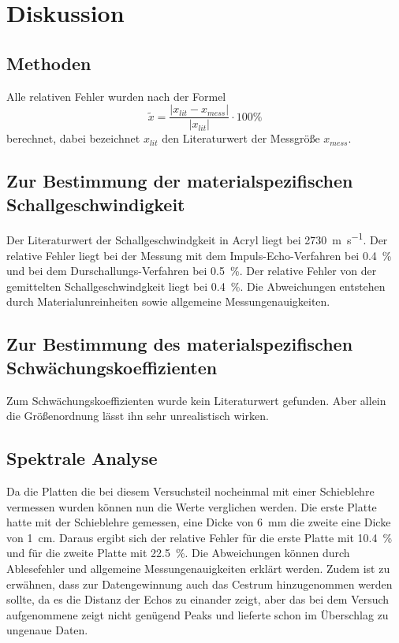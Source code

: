 \section{Diskussion}
\label{sec:Diskussion}
\subsection{Methoden}
Alle relativen Fehler wurden nach der Formel
\begin{equation*}
  \tilde{x} = \frac{ \lvert x_{lit} - x_{mess} \rvert}{\lvert x_{lit} \rvert}
  \cdot 100 \%
\end{equation*}
berechnet, dabei bezeichnet $x_{lit}$ den Literaturwert der Messgröße $x_{mess}$.
\subsection{Zur Bestimmung der materialspezifischen Schallgeschwindigkeit}
Der Literaturwert der Schallgeschwindgkeit in Acryl \cite{oly} liegt bei
\SI{2730}{\meter \per \second}. Der relative Fehler liegt bei der Messung mit
dem Impuls-Echo-Verfahren bei \SI{0.4}{\percent} und bei dem Durschallungs-Verfahren
bei \SI{0.5}{\percent}. Der relative Fehler von der gemittelten Schallgeschwindgkeit
liegt bei \SI{0.4}{\percent}. Die Abweichungen entstehen durch Materialunreinheiten
sowie allgemeine Messungenauigkeiten.
\subsection{Zur Bestimmung des materialspezifischen Schwächungskoeffizienten}
Zum Schwächungskoeffizienten wurde kein Literaturwert gefunden. Aber allein die
Größenordnung lässt ihn sehr unrealistisch wirken.
\subsection{Spektrale Analyse}
Da die Platten die bei diesem Versuchsteil nocheinmal mit einer Schieblehre
vermessen wurden können nun die Werte verglichen werden. Die erste Platte hatte
mit der Schieblehre gemessen, eine Dicke von \SI{6}{\milli\meter} die zweite
eine Dicke von \SI{1}{\centi\meter}. Daraus ergibt sich der relative Fehler für
die erste Platte mit \SI{10.4}{\percent} und für die zweite Platte mit
\SI{22.5}{\percent}. Die Abweichungen können durch Ablesefehler und allgemeine
Messungenauigkeiten erklärt werden. Zudem ist zu erwähnen, dass zur Datengewinnung
auch das Cestrum hinzugenommen werden sollte, da es die Distanz der Echos zu einander
zeigt, aber das bei dem Versuch aufgenommene zeigt nicht genügend Peaks und lieferte
schon im Überschlag zu ungenaue Daten.
